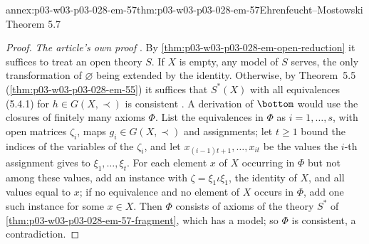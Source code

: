 \begin{annexitem}{annex:p03-w03-p03-028-em-57}{thm:p03-w03-p03-028-em-57}{Ehrenfeucht--Mostowski Theorem 5.7}
\begin{proof}
\emph{The article's own proof} \cite[pp.~63--66]{EhrenfeuchtMostowski1956}.  By
\cref{thm:p03-w03-p03-028-em-open-reduction} it suffices to treat an open
theory \(S\).  If \(X\) is empty, any model of \(S\) serves, the only
transformation of \(\varnothing\) being extended by the identity.  Otherwise,
by Theorem~5.5 (\cref{thm:p03-w03-p03-028-em-55}) it suffices that \(S^*(X)\)
with all equivalences (5.4.1) for
\(h\in G(X,\prec)\) is consistent \cite[p.~63]{EhrenfeuchtMostowski1956}.  A derivation of
\(\bottom\) would use the closures of finitely many axioms \(\Phi\).  List the
equivalences in \(\Phi\) as \(i=1,\ldots,s\), with open matrices \(\zeta_i\),
maps \(g_i\in G(X,\prec)\) and assignments; let \(t\geq1\) bound the indices of
the variables of the \(\zeta_i\), and let \(x_{(i-1)t+1},\ldots,x_{it}\) be the
values the \(i\)-th assignment gives to \(\xi_1,\ldots,\xi_t\).  For each
element \(x\) of \(X\) occurring in \(\Phi\) but not among these values, add an
instance with \(\zeta=\xi_1\iota\xi_1\), the identity of \(X\), and all values
equal to \(x\); if no equivalence and no element of \(X\) occurs in \(\Phi\),
add one such instance for some \(x\in X\).  Then \(\Phi\) consists of axioms of
the theory \(S^*\) of \cref{thm:p03-w03-p03-028-em-57-fragment}, which has a
model; so \(\Phi\) is consistent, a contradiction.
\end{proof}
\end{annexitem}

